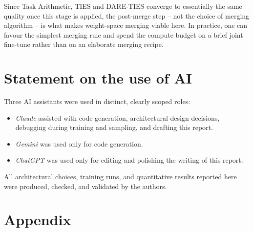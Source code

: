 \documentclass{article}
\begin{document}
Since Task Arithmetic, TIES and DARE-TIES converge to essentially the same quality once this stage is applied, the post-merge step -- not the choice of merging algorithm -- is what makes weight-space merging viable here. In practice, one can favour the simplest merging rule and spend the compute budget on a brief joint fine-tune rather than on an elaborate merging recipe.

\section{Statement on the use of AI}
\label{sec:ai}

Three AI assistants were used in distinct, clearly scoped roles:

\begin{itemize}
	\item \emph{Claude} assisted with code generation, architectural design decisions, debugging during training and sampling, and drafting this report.
	\item \emph{Gemini} was used only for code generation.
	\item \emph{ChatGPT} was used only for editing and polishing the writing of this report.
\end{itemize}

All architectural choices, training runs, and quantitative results reported here were produced, checked, and validated by the authors.




\newpage

\section*{Appendix}
\end{document}
